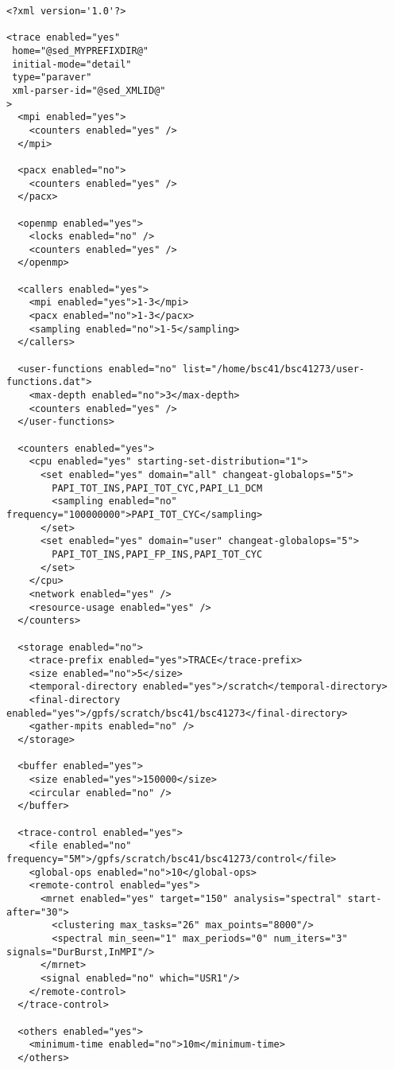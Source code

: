 \begin{verbatim}
<?xml version='1.0'?>

<trace enabled="yes"
 home="@sed_MYPREFIXDIR@"
 initial-mode="detail"
 type="paraver"
 xml-parser-id="@sed_XMLID@"
>
  <mpi enabled="yes">
    <counters enabled="yes" />
  </mpi>

  <pacx enabled="no">
    <counters enabled="yes" />
  </pacx>

  <openmp enabled="yes">
    <locks enabled="no" />
    <counters enabled="yes" />
  </openmp>

  <callers enabled="yes">
    <mpi enabled="yes">1-3</mpi>
    <pacx enabled="no">1-3</pacx>
    <sampling enabled="no">1-5</sampling>
  </callers>

  <user-functions enabled="no" list="/home/bsc41/bsc41273/user-functions.dat">
    <max-depth enabled="no">3</max-depth>
    <counters enabled="yes" />
  </user-functions>

  <counters enabled="yes">
    <cpu enabled="yes" starting-set-distribution="1">
      <set enabled="yes" domain="all" changeat-globalops="5">
        PAPI_TOT_INS,PAPI_TOT_CYC,PAPI_L1_DCM
        <sampling enabled="no" frequency="100000000">PAPI_TOT_CYC</sampling>
      </set>
      <set enabled="yes" domain="user" changeat-globalops="5">
        PAPI_TOT_INS,PAPI_FP_INS,PAPI_TOT_CYC
      </set>
    </cpu>
    <network enabled="yes" />
    <resource-usage enabled="yes" />
  </counters>

  <storage enabled="no">
    <trace-prefix enabled="yes">TRACE</trace-prefix>
    <size enabled="no">5</size>
    <temporal-directory enabled="yes">/scratch</temporal-directory>
    <final-directory enabled="yes">/gpfs/scratch/bsc41/bsc41273</final-directory>
    <gather-mpits enabled="no" />
  </storage>

  <buffer enabled="yes">
    <size enabled="yes">150000</size>
    <circular enabled="no" />
  </buffer>

  <trace-control enabled="yes">
    <file enabled="no" frequency="5M">/gpfs/scratch/bsc41/bsc41273/control</file>
    <global-ops enabled="no">10</global-ops>
    <remote-control enabled="yes">
      <mrnet enabled="yes" target="150" analysis="spectral" start-after="30">
        <clustering max_tasks="26" max_points="8000"/>
        <spectral min_seen="1" max_periods="0" num_iters="3" signals="DurBurst,InMPI"/>
      </mrnet>
      <signal enabled="no" which="USR1"/>
    </remote-control>
  </trace-control> 

  <others enabled="yes">
    <minimum-time enabled="no">10m</minimum-time>
  </others>


\end{verbatim}
